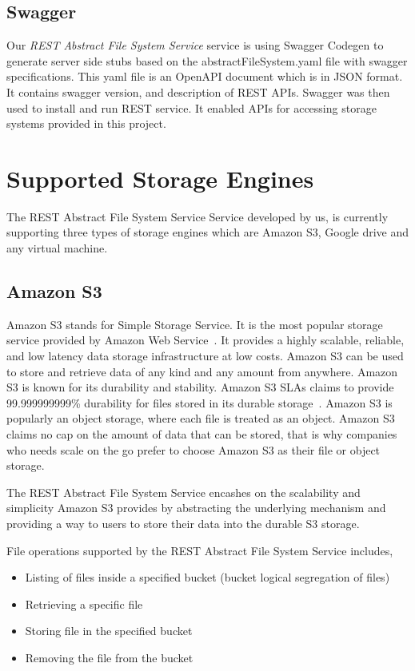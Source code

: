 \subsection{Swagger}

Our \emph{REST Abstract File System Service} service is using Swagger Codegen
to generate server side stubs based on the abstractFileSystem.yaml
file with swagger specifications.  This yaml file is an OpenAPI
document which is in JSON format.  It contains swagger version, and
description of REST APIs.  Swagger was then used to install and run
REST service. It enabled APIs for accessing storage systems provided
in this project.

\section{Supported Storage Engines}

The REST Abstract File System Service Service developed by us, is currently
supporting three types of storage engines which are Amazon S3, Google
drive and any virtual machine. 

\subsection{Amazon S3}

Amazon S3 stands for Simple Storage Service. It is the most popular
storage service provided by Amazon Web
Service~\cite{hid-sp18-420-amazon-S3}. It provides a highly scalable,
reliable, and low latency data storage infrastructure at low
costs. Amazon S3 can be used to store and retrieve data of any kind
and any amount from anywhere. Amazon S3 is known for its durability
and stability. Amazon S3 SLAs claims to provide 99.999999999\%
durability for files stored in its durable
storage~\cite{hid-sp18-420-amazon-S3}. Amazon S3 is popularly an
object storage, where each file is treated as an object. Amazon S3
claims no cap on the amount of data that can be stored, that is why
companies who needs scale on the go prefer to choose Amazon S3 as
their file or object storage.

The REST Abstract File System Service encashes on the scalability and
simplicity Amazon S3 provides by abstracting the underlying mechanism
and providing a way to users to store their data into the durable S3
storage.

File operations supported by the REST Abstract File System Service
includes,

\begin{itemize}
\item Listing of files inside a specified bucket (bucket logical
  segregation of files)
\item Retrieving a specific file
\item Storing file in the specified bucket
\item Removing the file from the bucket
\end{itemize}



